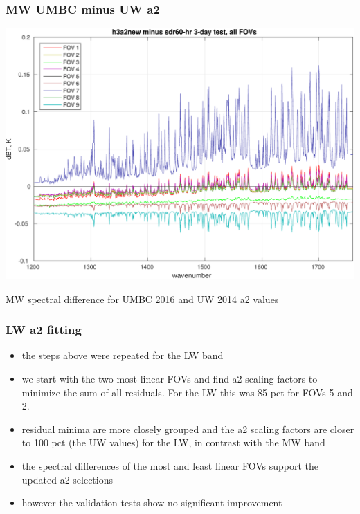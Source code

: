 \documentclass[11pt]{beamer}
\begin{document}
\begin{frame}
\frametitle{MW UMBC minus UW a2}
\begin{center}
  \includegraphics[scale=0.5]{figures/MW_a2new_minus_sdr60.pdf}
\end{center}
\begin{center}
  MW spectral difference for UMBC 2016 and UW 2014 a2 values
\end{center}
\end{frame}
\begin{frame}
\frametitle{LW a2 fitting}

\begin{itemize}

  \item the steps above were repeated for the LW band

  \item we start with the two most linear FOVs and find a2 scaling
    factors to minimize the sum of all residuals.  For the LW this
    was 85 pct for FOVs 5 and 2.

  \item residual minima are more closely grouped and the a2 scaling
    factors are closer to 100 pct (the UW values) for the LW, in
    contrast with the MW band

  \item the spectral differences of the most and least linear FOVs
    support the updated a2 selections

  \item however the validation tests show no significant improvement

\end{itemize}

\end{frame}
\end{document}
